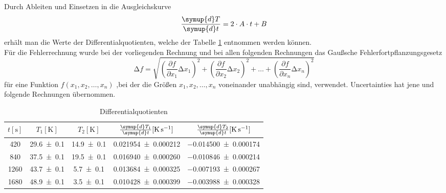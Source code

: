 Durch Ableiten und Einsetzen in die Ausgleichskurve
\begin{equation}
  \frac{\symup{d}T}{\symup{d}t}= 2 \cdot A \cdot t + B
\end{equation}
erhält man die Werte der Differentialquotienten, welche der Tabelle \ref{tab:tabelle1} entnommen werden können.
\\
Für die Fehlerrechnung wurde bei der vorliegenden Rechnung und bei allen folgenden Rechnungen das Gaußsche Fehlerfortpflanzungsgesetz
\begin{equation}
\increment{f} = \sqrt{(\frac{\partial f}{\partial x_1}\increment{x_1})^2 + (\frac{\partial f}{\partial x_2}\increment{x_2})^2 + \dotsc + (\frac{\partial f}{\partial x_n}\increment{x_n})^2}
\end{equation}
für eine Funktion $f(x_1,x_2, \dotsc ,x_n)$ ,bei der die Größen $x_1, x_2, \dotsc , x_n$ voneinander unabhängig sind, verwendet.
Uncertainties \cite{uncertainties} hat jene und folgende Rechnungen übernommen.
\begin{table}
  \centering
  \caption{Differentialquotienten}
  \label{tab:tabelle1}
  \begin{tabular}{c c c c c}
    \toprule
    {$t [\si{\second}]$} & {$T_1 [\si{\kelvin}]$} & {$T_2 [\si{\kelvin}]$} & {$\frac{\symup{d}T_1}{\symup{d}t} [\si{\kelvin\per\second}]$}  & {$\frac{\symup{d}T_2}{\symup{d}t} [\si{\kelvin\per\second}]$}\\
    \midrule
    \num{420} & \num{29.6 +- 0.1} & \num{14.9 +- 0.1} & \num{0.021954 +- 0.000212} & \num{-0.014500 +- 0.000174} \\
    \num{840} & \num{37.5 +- 0.1} & \num{19.5 +- 0.1} & \num{0.016940 +- 0.000260} & \num{-0.010846 +- 0.000214} \\
    \num{1260} & \num{43.7 +- 0.1} & \num{5.7 +- 0.1} & \num{0.013684 +- 0.000325} & \num{-0.007193 +- 0.000267} \\
    \num{1680} & \num{48.9 +- 0.1} & \num{3.5 +- 0.1} & \num{0.010428 +- 0.000399} & \num{-0.003988 +- 0.000328} \\
    \bottomrule
  \end{tabular}
\end{table}
